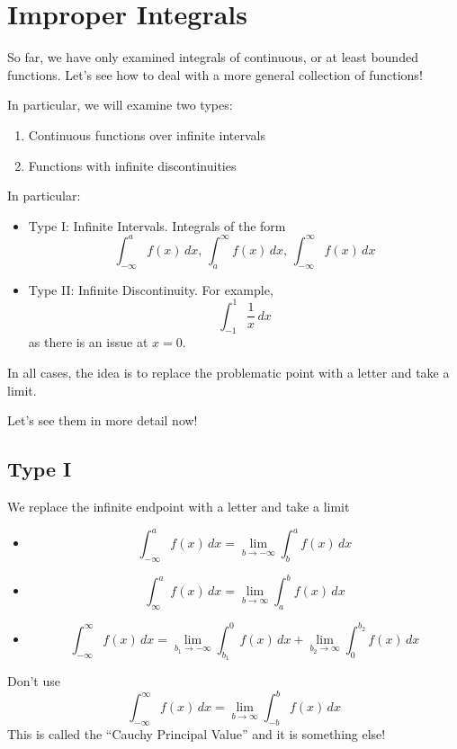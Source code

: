 \section{Improper Integrals}
So far, we have only examined integrals of continuous, or at
least bounded functions. Let's see how to deal with a more general
collection of functions!

In particular, we will examine two types:
\begin{enumerate}[label=\arabic*)]
    \item Continuous functions over infinite intervals
    \item Functions with infinite discontinuities
\end{enumerate}

In particular:
\begin{itemize}
    \item Type I: Infinite Intervals. Integrals of the form
          \[ \int_{-\infty}^{a} f(x)\, d{x},\,\int_{a}^{\infty} f(x)\, d{x},\,
              \int_{-\infty}^{\infty} f(x)\, d{x} \]
    \item Type II: Infinite Discontinuity. For example,
          \[ \int_{-1}^{1} \frac{1}{x} \, d{x}  \]
          as there is an issue at $ x=0 $.
\end{itemize}

In all cases, the idea is to replace the problematic point with a
letter and take a limit.

Let's see them in more detail now!

\subsection{Type I}
We replace the infinite endpoint with a letter and take a limit
\begin{itemize}
    \item \[ \int_{-\infty}^{a} f(x)\, d{x} =\lim\limits_{{b} \to {-\infty}}
              \int_{b}^{a} f(x)\, d{x} \]
    \item \[ \int_{\infty}^{a} f(x)\, d{x} =\lim\limits_{{b} \to {\infty}}
              \int_{a}^{b} f(x)\, d{x} \]
    \item \[ \int_{-\infty}^{\infty} f(x)\, d{x}=
              \lim\limits_{{b_1} \to {-\infty}} \int_{b_1}^{0} f(x)\, d{x}+
              \lim\limits_{{b_2} \to {\infty}} \int_{0}^{b_2} f(x)\, d{x}  \]
\end{itemize}
Don't use
\[ \int_{-\infty}^{\infty} f(x)\, d{x}=\lim\limits_{{b} \to {\infty}}
    \int_{-b}^{b} f(x)\, d{x}  \]
This is called the ``Cauchy Principal Value'' and it is something else!


